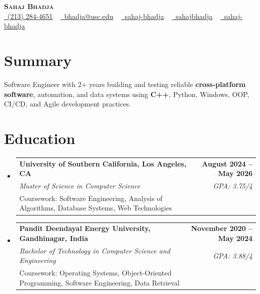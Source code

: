 \documentclass[letterpaper,10pt]{article}
\makeatletter
\newcommand{\sectionGap}{\vspace{-8pt}}
\newcommand{\resumeEduSubheading}[5]{\vspace{-1pt}\item\begin{tabular*}{1.0\textwidth}[t]{l@{\extracolsep{\fill}}r}\textbf{#1} & \textbf{\small #2} \\\textit{\small #3} & \textit{\small #4} \\\small #5 & \\\end{tabular*}\vspace{-4pt}}
\newcommand{\resumeSubHeadingListStart}{\begin{itemize}[leftmargin=0.0in, label={}]}
\newcommand{\resumeSubHeadingListEnd}{\end{itemize}}
\makeatother
\begin{document}
\begin{center}
{\Huge \scshape \textbf{Sahaj Bhadja}} \\ \vspace{1pt}
\small \href{tel:2132844651}{\faPhone\ \underline{(213) 284-4651}} ~ \href{mailto:bhadja@usc.edu}{\raisebox{-0.2\height}\faEnvelope\ \underline{bhadja@usc.edu}} ~
\href{https://www.linkedin.com/in/sahaj-bhadja/}{\raisebox{-0.2\height}\faLinkedin\ \underline{sahaj-bhadja}} ~ \href{https://github.com/SAHAJ-BHADJA}{\raisebox{-0.2\height}\faGithub\ \underline{sahajbhadja}} ~
\href{https://sahaj-bhadja.vercel.app/}{\raisebox{-0.2\height}\faGlobe\ \underline{sahaj-bhadja}}
\end{center}
\vspace{-16pt}
\section{Summary}
\begin{itemize}[leftmargin=0.15in, label={}]
\small{\item{Software Engineer with 2+ years building and testing reliable \textbf{cross-platform software}, automation, and data systems using \textbf{C++}, Python, Windows, OOP, CI/CD, and Agile development practices.}}
\end{itemize}
\sectionGap
\section{Education}
\resumeSubHeadingListStart
\resumeEduSubheading{University of Southern California, Los Angeles, CA}{August 2024 -- May 2026}{Master of Science in Computer Science}{GPA: 3.75/4}{Coursework: Software Engineering, Analysis of Algorithms, Database Systems, Web Technologies}
\resumeEduSubheading{Pandit Deendayal Energy University, Gandhinagar, India}{November 2020 -- May 2024}{Bachelor of Technology in Computer Science and Engineering}{GPA: 3.88/4}{Coursework: Operating Systems, Object-Oriented Programming, Software Engineering, Data Retrieval}
\resumeSubHeadingListEnd
\sectionGap
\end{document}
